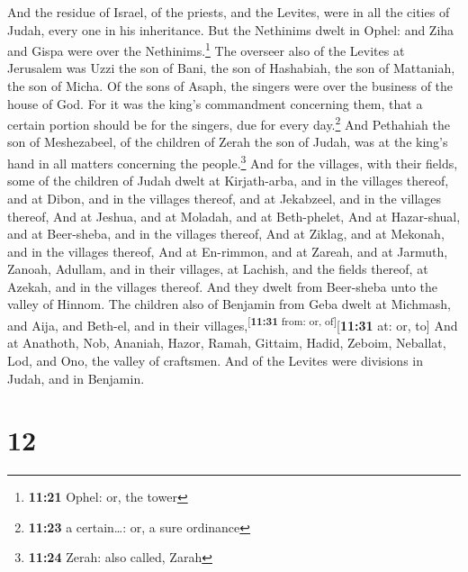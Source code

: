  And the residue of Israel, of the priests, and the
Levites, were in all the cities of Judah, every one in his inheritance.
 But the Nethinims dwelt in Ophel: and Ziha and Gispa
were over the Nethinims.\footnote{\textbf{11:21} Ophel: or, the tower}
 The overseer also of the Levites at Jerusalem was Uzzi
the son of Bani, the son of Hashabiah, the son of Mattaniah, the son of
Micha. Of the sons of Asaph, the singers were over the business of the
house of God.  For it was the king's commandment
concerning them, that a certain portion should be for the singers, due
for every day.\footnote{\textbf{11:23} a certain\ldots: or, a sure
  ordinance}  And Pethahiah the son of Meshezabeel, of
the children of Zerah the son of Judah, was at the king's hand in all
matters concerning the people.\footnote{\textbf{11:24} Zerah: also
  called, Zarah}  And for the villages, with their
fields, some of the children of Judah dwelt at Kirjath-arba, and in the
villages thereof, and at Dibon, and in the villages thereof, and at
Jekabzeel, and in the villages thereof,  And at Jeshua,
and at Moladah, and at Beth-phelet,  And at Hazar-shual,
and at Beer-sheba, and in the villages thereof,  And at
Ziklag, and at Mekonah, and in the villages thereof,  And
at En-rimmon, and at Zareah, and at Jarmuth,  Zanoah,
Adullam, and in their villages, at Lachish, and the fields thereof, at
Azekah, and in the villages thereof. And they dwelt from Beer-sheba unto
the valley of Hinnom.  The children also of Benjamin from
Geba dwelt at Michmash, and Aija, and Beth-el, and in their
villages,\textsuperscript{{[}\textbf{11:31} from: or,
of{]}}{[}\textbf{11:31} at: or, to{]}  And at Anathoth,
Nob, Ananiah,  Hazor, Ramah, Gittaim, 
Hadid, Zeboim, Neballat,  Lod, and Ono, the valley of
craftsmen.  And of the Levites were divisions in Judah,
and in Benjamin.

\hypertarget{section-11}{%
\section{12}\label{section-11}}

